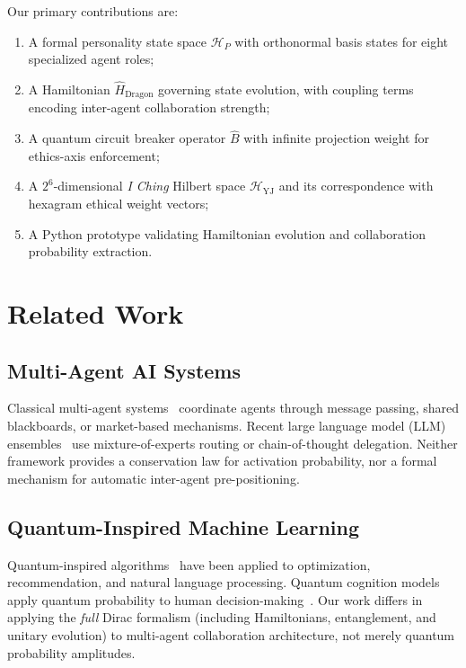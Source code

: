 \documentclass[conference]{IEEEtran}
\begin{document}
Our primary contributions are:
\begin{enumerate}
  \item A formal personality state space $\mathcal{H}_P$
        with orthonormal basis states for eight specialized
        agent roles;
  \item A Hamiltonian $\hat{H}_{\text{Dragon}}$ governing
        state evolution, with coupling terms encoding
        inter-agent collaboration strength;
  \item A quantum circuit breaker operator
        $\hat{B}$ with infinite projection weight for
        ethics-axis enforcement;
  \item A $2^6$-dimensional \textit{I Ching} Hilbert space
        $\mathcal{H}_{\text{YJ}}$ and its correspondence
        with hexagram ethical weight vectors;
  \item A Python prototype validating Hamiltonian evolution
        and collaboration probability extraction.
\end{enumerate}

\section{Related Work}

\subsection{Multi-Agent AI Systems}

Classical multi-agent systems~\cite{wooldridge2009multiagent}
coordinate agents through message passing, shared blackboards,
or market-based mechanisms. Recent large language model (LLM)
ensembles~\cite{russell2019human} use mixture-of-experts
routing or chain-of-thought delegation. Neither framework
provides a conservation law for activation probability,
nor a formal mechanism for automatic inter-agent
pre-positioning.

\subsection{Quantum-Inspired Machine Learning}

Quantum-inspired algorithms~\cite{biamonte2017quantum}
have been applied to optimization, recommendation, and
natural language processing. Quantum cognition models apply
quantum probability to human decision-making~\cite{busemeyer2012quantum}.
Our work differs in applying the \textit{full} Dirac formalism
(including Hamiltonians, entanglement, and unitary evolution)
to multi-agent collaboration architecture, not merely
quantum probability amplitudes.
\end{document}
